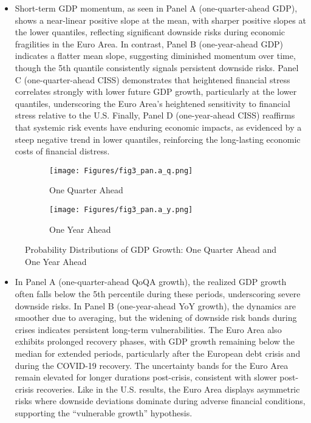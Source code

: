 \documentclass{article}
\begin{document}
\begin{itemize}
    \item Short-term GDP momentum, as seen in Panel A (one-quarter-ahead GDP), shows a near-linear positive slope at the mean, with sharper positive slopes at the lower quantiles, reflecting significant downside risks during economic fragilities in the Euro Area. In contrast, Panel B (one-year-ahead GDP) indicates a flatter mean slope, suggesting diminished momentum over time, though the 5th quantile consistently signals persistent downside risks. Panel C (one-quarter-ahead CISS) demonstrates that heightened financial stress correlates strongly with lower future GDP growth, particularly at the lower quantiles, underscoring the Euro Area's heightened sensitivity to financial stress relative to the U.S. Finally, Panel D (one-year-ahead CISS) reaffirms that systemic risk events have enduring economic impacts, as evidenced by a steep negative trend in lower quantiles, reinforcing the long-lasting economic costs of financial distress.
\end{itemize}

\begin{figure}[H]
    \centering
    \begin{subfigure}[b]{0.45\textwidth}
        \centering
        \texttt{[image: Figures/fig3\_pan.a\_q.png]}
        \caption{One Quarter Ahead}
        \label{fig:sub_a}
    \end{subfigure}
    \hfill
    \begin{subfigure}[b]{0.45\textwidth}
        \centering
        \texttt{[image: Figures/fig3\_pan.a\_y.png]}
        \caption{One Year Ahead}
        \label{fig:sub_b}
    \end{subfigure}

    \caption{Probability Distributions of GDP Growth: One Quarter Ahead and One Year Ahead}
    \label{fig:fig3_combined}
\end{figure}

\begin{itemize}
    \item In Panel A (one-quarter-ahead QoQA growth), the realized GDP growth often falls below the 5th percentile during these periods, underscoring severe downside risks. In Panel B (one-year-ahead YoY growth), the dynamics are smoother due to averaging, but the widening of downside risk bands during crises indicates persistent long-term vulnerabilities. The Euro Area also exhibits prolonged recovery phases, with GDP growth remaining below the median for extended periods, particularly after the European debt crisis and during the COVID-19 recovery. The uncertainty bands for the Euro Area remain elevated for longer durations post-crisis, consistent with slower post-crisis recoveries. Like in the U.S. results, the Euro Area displays asymmetric risks where downside deviations dominate during adverse financial conditions, supporting the “vulnerable growth” hypothesis.
\end{itemize}
\end{document}
